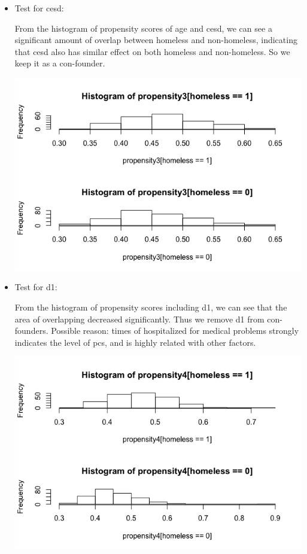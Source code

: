 \documentclass{report}
\begin{document}
\begin{itemize}
\begin{minipage}{0.5\linewidth}
    \end{minipage}
    \item Test for cesd:\\
    \begin{minipage}{0.5\linewidth}
         From the histogram of propensity scores of age and cesd, we can see a significant amount of overlap between homeless and non-homeless, indicating that cesd also has similar effect on both homeless and non-homeless. So we keep it as a con-founder.
    \end{minipage}
    \begin{minipage}{0.5\linewidth}
        \centering
        \includegraphics[scale=0.25]{3.png}
    \end{minipage}
    \item Test for d1:\\
    \begin{minipage}{0.5\linewidth}
         From the histogram of propensity scores including d1, we can see that the area of overlapping decreased significantly. Thus we remove d1 from con-founders. Possible reason: times of hospitalized for medical problems strongly indicates the level of pcs, and is highly related with other factors.
    \end{minipage}
    \begin{minipage}{0.5\linewidth}
        \centering
        \includegraphics[scale=0.25]{4.png}

\end{minipage}
\end{itemize}
\end{document}

